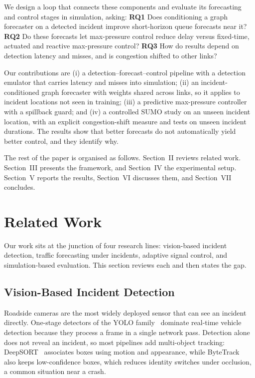 \documentclass[conference]{IEEEtran}
\begin{document}
We design a loop that connects these components and evaluate its forecasting and control stages in simulation, asking:
\textbf{RQ1} Does conditioning a graph forecaster on a detected incident improve short-horizon queue forecasts near it?
\textbf{RQ2} Do these forecasts let max-pressure control reduce delay versus fixed-time, actuated and reactive max-pressure control?
\textbf{RQ3} How do results depend on detection latency and misses, and is congestion shifted to other links?

Our contributions are (i) a detection--forecast--control pipeline with a detection emulator that carries latency and misses into simulation; (ii) an incident-conditioned graph forecaster with weights shared across links, so it applies to incident locations not seen in training; (iii) a predictive max-pressure controller with a spillback guard; and (iv) a controlled SUMO study on an unseen incident location, with an explicit congestion-shift measure and tests on unseen incident durations. The results show that better forecasts do not automatically yield better control, and they identify why.

The rest of the paper is organised as follows. Section~II reviews related work. Section~III presents the framework, and Section~IV the experimental setup. Section~V reports the results, Section~VI discusses them, and Section~VII concludes.

\section{Related Work}
Our work sits at the junction of four research lines: vision-based incident detection, traffic forecasting under incidents, adaptive signal control, and simulation-based evaluation. This section reviews each and then states the gap.

\subsection{Vision-Based Incident Detection}
Roadside cameras are the most widely deployed sensor that can see an incident directly. One-stage detectors of the YOLO family~\cite{redmon2016yolo} dominate real-time vehicle detection because they process a frame in a single network pass. Detection alone does not reveal an incident, so most pipelines add multi-object tracking: DeepSORT~\cite{wojke2017deepsort} associates boxes using motion and appearance, while ByteTrack~\cite{zhang2022bytetrack} also keeps low-confidence boxes, which reduces identity switches under occlusion, a common situation near a crash.
\end{document}
